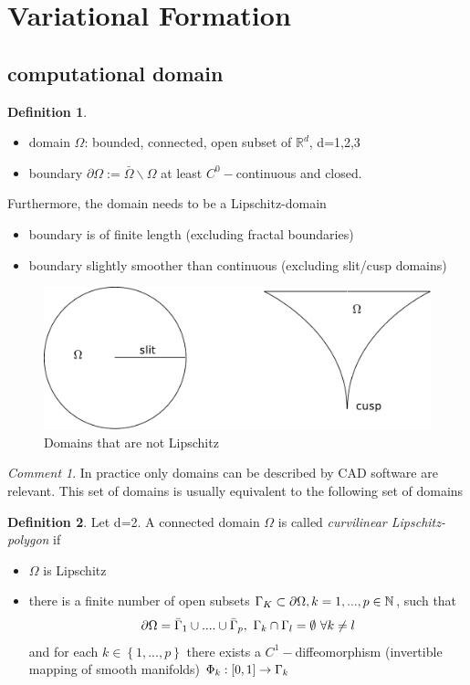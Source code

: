 \documentclass[english]{article}
\theoremstyle{definition}
\newtheorem*{defi}{Definition}
\theoremstyle{remark}
\newtheorem*{comm}{Comment}
\newcommand{\p}{\partial}
\newcommand{\NN}{\mathbb{N}}			%
\newcommand{\RR}{\mathbb{R}}			%
\newcommand{\OO}{\Omega}
\begin{document}
\section{Variational Formation}
\subsection{computational domain}
\begin{defi}
  \begin{itemize}
  \item domain $\OO$: bounded, connected, open subset of $\RR^d$, d=1,2,3
  \item boundary $\p\OO:=\bar\OO \backslash \OO$ at least $C^0-$continuous and closed.
  \end{itemize}
  Furthermore, the domain needs to be a Lipschitz-domain
  \begin{itemize}
  \item boundary is of finite length (excluding fractal boundaries)
  \item boundary slightly smoother than continuous (excluding slit/cusp domains)
  \end{itemize}
\end{defi}

\begin{figure}[H]
  \begin{center}
    \includegraphics[width=\textwidth]{figs/notLipschitzDomain.pdf}
  \end{center}
  \caption{Domains that are not Lipschitz}
  \label{not-lipschitz-figure}
\end{figure}

\begin{comm}
  In practice only domains can be described by CAD software are relevant. This set of domains is usually equivalent to the following set of domains\end{comm}

\begin{defi}
  Let d=2. A connected domain $\OO$ is called   \emph{curvilinear Lipschitz-polygon} if 
  \begin{itemize}
  \item $\OO$ is Lipschitz
  \item there is a finite number of open subsets $\GG_K\subset \p\OO, k=1,...,p\in \NN$, such that 
    $$\p\OO=\bar\GG_1\cup....\cup \bar\GG_p,\ \GG_k\cap \GG_l=\emptyset \ \forall k\neq l$$
    and for each $k\in\left\{1,...,p\right\}$ there exists a $C^1-$diffeomorphism (invertible mapping of smooth manifolds) $\Phi_k : [0,1]\to \Gamma_k$
  \end{itemize}
\end{defi}
\end{document}
